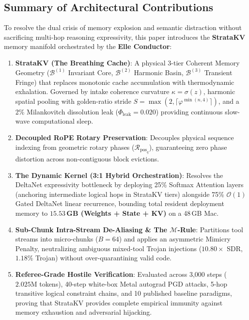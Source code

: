\documentclass[11pt,letterpaper]{article}
\theoremstyle{definition}
\begin{document}
\subsection{Summary of Architectural Contributions}
To resolve the dual crisis of memory explosion and semantic distraction without sacrificing multi-hop reasoning expressivity, this paper introduces the \textbf{StrataKV} memory manifold orchestrated by the \textbf{Elle Conductor}:

\begin{enumerate}
    \item \textbf{StrataKV (The Breathing Cache)}: A physical 3-tier Coherent Memory Geometry ($\mathcal{B}^{(1)}$ Invariant Core, $\mathcal{B}^{(2)}$ Harmonic Basin, $\mathcal{B}^{(3)}$ Transient Fringe) that replaces monotonic cache accumulation with thermodynamic exhalation. Governed by intake coherence curvature $\kappa = \sigma(z)$, harmonic spatial pooling with golden-ratio stride $S = \max(2, \lceil\varphi^{\min(n,4)}\rceil)$, and a 2\% Milankovitch dissolution leak ($\Phi_{\text{leak}} = 0.020$) providing continuous slow-wave computational sleep.
    \item \textbf{Decoupled RoPE Rotary Preservation}: Decouples physical sequence indexing from geometric rotary phases ($\mathcal{R}_{\text{pos}_q}$), guaranteeing zero phase distortion across non-contiguous block evictions.
    \item \textbf{The Dynamic Kernel (3:1 Hybrid Orchestration)}: Resolves the DeltaNet expressivity bottleneck by deploying 25\% Softmax Attention layers (anchoring intermediate logical hops in StrataKV tiers) alongside 75\% $\mathcal{O}(1)$ Gated DeltaNet linear recurrence, bounding total resident deployment memory to \textbf{$15.53$\,GB (Weights + State + KV)} on a 48\,GB Mac.
    \item \textbf{Sub-Chunk Intra-Stream De-Aliasing \& The $\mathcal{M}$-Rule}: Partitions tool streams into micro-chunks ($B=64$) and applies an asymmetric Mimicry Penalty, neutralizing ambiguous mixed-tool Trojan injections ($10.80\times$ SDR, $1.18\%$ Trojan) without over-quarantining valid code.
    \item \textbf{Referee-Grade Hostile Verification}: Evaluated across 3,000 steps ($2.025\text{M}$ tokens), 40-step white-box Metal autograd PGD attacks, 5-hop transitive logical constraint chains, and 10 published baseline paradigms, proving that StrataKV provides complete empirical immunity against memory exhaustion and adversarial hijacking.
\end{enumerate}
\end{document}
